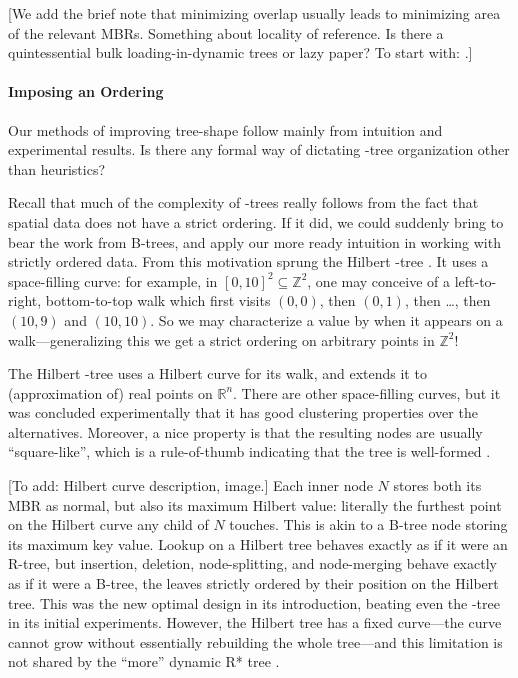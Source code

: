 [We add the brief note that minimizing overlap usually leads to minimizing area of the relevant MBRs.
Something about locality of reference.
Is there a quintessential bulk loading-in-dynamic trees or lazy paper?
To start with: \cite{argehinrichsvahrenholdvitter99}.]

\paragraph{Imposing an Ordering}
Our methods of improving tree-shape follow mainly from intuition and experimental results.
Is there any formal way of dictating \rbase-tree organization other than heuristics?

Recall that much of the complexity of \rbase-trees really follows from the fact that spatial data does not have a strict ordering.
If it did, we could suddenly bring to bear the work from B-trees, and apply our more ready intuition in working with strictly ordered data.
From this motivation sprung the Hilbert \rbase-tree \cite{kamelfaloutsos94}.
It uses a space-filling curve:
for example, in $[0,10]^2\subseteq\mathbb Z^2$, one may conceive of a left-to-right, bottom-to-top walk which first visits $(0,0)$, then $(0,1)$, then \ldots, then $(10,9)$ and $(10,10)$.
So we may characterize a value by when it appears on a walk---generalizing this we get a strict ordering on arbitrary points in $\mathbb Z^2$!

The Hilbert \rbase-tree uses a Hilbert curve for its walk, and extends it to (approximation of) real points on $\mathbb R^n$.
There are other space-filling curves, but it was concluded experimentally that it has good clustering properties \cite{kamelfaloutsos94} over the alternatives.
Moreover, a nice property is that the resulting nodes are usually ``square-like'', which is a rule-of-thumb indicating that the tree is well-formed \cite{kamelfaloutsos94,theodoridissellis96}.

[To add: Hilbert curve description, image.]
Each inner node $N$ stores both its MBR as normal, but also its maximum Hilbert value: literally the furthest point on the Hilbert curve any child of $N$ touches.
This is akin to a B-tree node storing its maximum key value.
Lookup on a Hilbert tree behaves exactly as if it were an R-tree, but insertion, deletion, node-splitting, and node-merging behave exactly as if it were a B-tree, the leaves strictly ordered by their position on the Hilbert tree.
This was the new optimal design in its introduction, beating even the \rstar-tree in its initial experiments.
However, the Hilbert tree has a fixed curve---the curve cannot grow without essentially rebuilding the whole tree---and this limitation is not shared by the ``more'' dynamic R* tree \cite{beckmannseeger09}.

